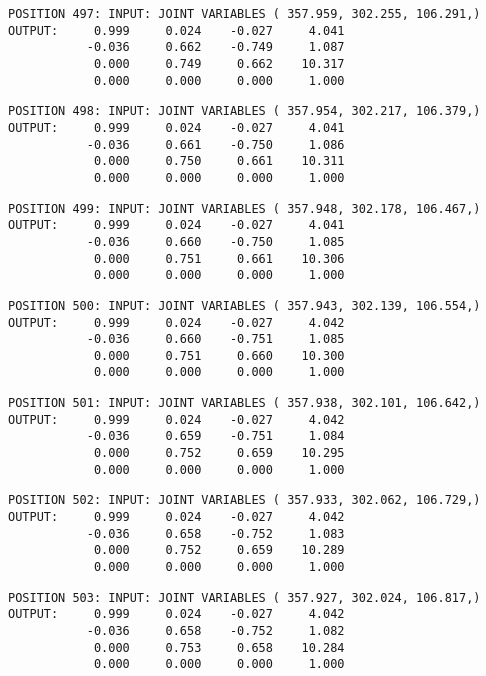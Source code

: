 \begin{verbatim}
POSITION 497: INPUT: JOINT VARIABLES ( 357.959, 302.255, 106.291,)
OUTPUT:     0.999     0.024    -0.027     4.041
           -0.036     0.662    -0.749     1.087
            0.000     0.749     0.662    10.317
            0.000     0.000     0.000     1.000
\end{verbatim} \pagebreak[1]\begin{verbatim}
POSITION 498: INPUT: JOINT VARIABLES ( 357.954, 302.217, 106.379,)
OUTPUT:     0.999     0.024    -0.027     4.041
           -0.036     0.661    -0.750     1.086
            0.000     0.750     0.661    10.311
            0.000     0.000     0.000     1.000
\end{verbatim} \pagebreak[1]\begin{verbatim}
POSITION 499: INPUT: JOINT VARIABLES ( 357.948, 302.178, 106.467,)
OUTPUT:     0.999     0.024    -0.027     4.041
           -0.036     0.660    -0.750     1.085
            0.000     0.751     0.661    10.306
            0.000     0.000     0.000     1.000
\end{verbatim} \pagebreak[1]\begin{verbatim}
POSITION 500: INPUT: JOINT VARIABLES ( 357.943, 302.139, 106.554,)
OUTPUT:     0.999     0.024    -0.027     4.042
           -0.036     0.660    -0.751     1.085
            0.000     0.751     0.660    10.300
            0.000     0.000     0.000     1.000
\end{verbatim} \pagebreak[1]\begin{verbatim}
POSITION 501: INPUT: JOINT VARIABLES ( 357.938, 302.101, 106.642,)
OUTPUT:     0.999     0.024    -0.027     4.042
           -0.036     0.659    -0.751     1.084
            0.000     0.752     0.659    10.295
            0.000     0.000     0.000     1.000
\end{verbatim} \pagebreak[1]\begin{verbatim}
POSITION 502: INPUT: JOINT VARIABLES ( 357.933, 302.062, 106.729,)
OUTPUT:     0.999     0.024    -0.027     4.042
           -0.036     0.658    -0.752     1.083
            0.000     0.752     0.659    10.289
            0.000     0.000     0.000     1.000
\end{verbatim} \pagebreak[1]\begin{verbatim}
POSITION 503: INPUT: JOINT VARIABLES ( 357.927, 302.024, 106.817,)
OUTPUT:     0.999     0.024    -0.027     4.042
           -0.036     0.658    -0.752     1.082
            0.000     0.753     0.658    10.284
            0.000     0.000     0.000     1.000
\end{verbatim} \pagebreak[1]\begin{verbatim}

\end{verbatim}
